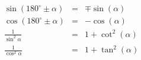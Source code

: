 \begin{align*}
     & \sin(180^\circ\pm\alpha)                                                         & = & \mp\sin(\alpha)                                         \\
     & \cos(180^\circ\pm\alpha)                                                         & = & -\cos(\alpha)                                           \\
     & \frac{1}{\sin^2 \alpha}                                                          & = & 1+\cot^2 (\alpha)                                       \\
     & \frac{1}{\cos^2 \alpha}                                                          & = & 1+\tan^2 (\alpha)                                       \\
\end{align*}

